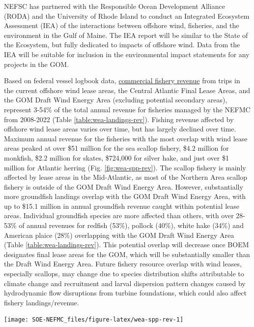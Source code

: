 \documentclass[
  10pt,
]{article}
\let\origfigure\figure
\let\endorigfigure\endfigure
\renewenvironment{figure}[1][2] {
    \expandafter\origfigure\expandafter[H]
} {
    \endorigfigure
}
\begin{document}
NEFSC has partnered with the Responsible Ocean Development Alliance (RODA) and the University of Rhode Island to conduct an Integrated Ecosystem Assessment (IEA) of the interactions between offshore wind, fisheries, and the environment in the Gulf of Maine. The IEA report will be similar to the State of the Ecosystem, but fully dedicated to impacts of offshore wind. Data from the IEA will be suitable for inclusion in the environmental impact statements for any projects in the GOM.

Based on federal vessel logbook data, \href{https://noaa-edab.github.io/catalog/fishery-impacts-from-offshore-wind-development.html}{commercial fishery revenue} from trips in the current offshore wind lease areas, the Central Atlantic Final Lease Areas, and the GOM Draft Wind Energy Area (excluding potential secondary areas), represent 3-54\% of the total annual revenue for fisheries managed by the NEFMC from 2008-2022 (Table \ref{table:wea-landings-rev}). Fishing revenue affected by offshore wind lease areas varies over time, but has largely declined over time. Maximum annual revenue for the fisheries with the most overlap with wind lease areas peaked at over \$51 million for the sea scallop fishery, \$4.2 million for monkfish, \$2.2 million for skates, \$724,000 for silver hake, and just over \$1 million for Atlantic herring (Fig. \ref{fig:wea-spp-rev}). The scallop fishery is mainly affected by lease areas in the Mid-Atlantic, as most of the Northern Area scallop fishery is outside of the GOM Draft Wind Energy Area. However, substantially more groundfish landings overlap with the GOM Draft Wind Energy Area, with up to \$15.1 million in annual groundfish revenue caught within potential lease areas. Individual groundfish species are more affected than others, with over 28-53\% of annual revenues for redfish (53\%), pollock (40\%), white hake (34\%) and American plaice (28\%) overlapping with the GOM Draft Wind Energy Area (Table \ref{table:wea-landings-rev}). This potential overlap will decrease once BOEM designates final lease areas for the GOM, which will be substantially smaller than the Draft Wind Energy Area. Future fishery resource overlap with wind leases, especially scallops, may change due to species distribution shifts attributable to climate change and recruitment and larval dispersion pattern changes caused by hydrodynamic flow disruptions from turbine foundations, which could also affect fishery landings/revenue.

\begin{figure}

{\centering \texttt{[image: SOE-NEFMC\_files/figure-latex/wea-spp-rev-1]} 

}

\caption{Fishery revenues from NEFMC managed species in the Wind energy lease areas.}\label{fig:wea-spp-rev}
\end{figure}
\end{document}
